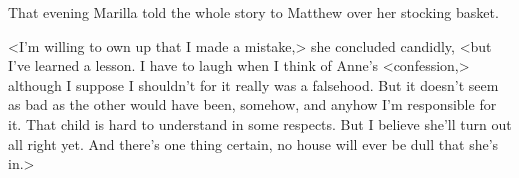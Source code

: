 That evening Marilla told the whole story to Matthew over her stocking basket.

<I'm willing to own up that I made a mistake,> she concluded candidly, <but I've learned a lesson. I have to laugh when I think of Anne's <confession,> although I suppose I shouldn't for it really was a falsehood. But it doesn't seem as bad as the other would have been, somehow, and anyhow I'm responsible for it. That child is hard to understand in some respects. But I believe she'll turn out all right yet. And there's one thing certain, no house will ever be dull that she's in.>